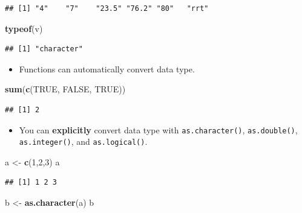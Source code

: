 \documentclass[]{book}
\newenvironment{Shaded}{\begin{snugshade}}{\end{snugshade}}
\newcommand{\KeywordTok}[1]{\textcolor[rgb]{0.13,0.29,0.53}{\textbf{{#1}}}}
\newcommand{\DecValTok}[1]{\textcolor[rgb]{0.00,0.00,0.81}{{#1}}}
\newcommand{\StringTok}[1]{\textcolor[rgb]{0.31,0.60,0.02}{{#1}}}
\newcommand{\OtherTok}[1]{\textcolor[rgb]{0.56,0.35,0.01}{{#1}}}
\newcommand{\NormalTok}[1]{{#1}}
\providecommand{\tightlist}{%
  \setlength{\itemsep}{0pt}\setlength{\parskip}{0pt}}
\begin{document}
\begin{verbatim}
## [1] "4"    "7"    "23.5" "76.2" "80"   "rrt"
\end{verbatim}

\begin{Shaded}
\begin{Highlighting}[]
\KeywordTok{typeof}\NormalTok{(v)}
\end{Highlighting}
\end{Shaded}

\begin{verbatim}
## [1] "character"
\end{verbatim}

\begin{itemize}
\tightlist
\item
  Functions can automatically convert data type.
\end{itemize}

\begin{Shaded}
\begin{Highlighting}[]
\KeywordTok{sum}\NormalTok{(}\KeywordTok{c}\NormalTok{(}\OtherTok{TRUE}\NormalTok{, }\OtherTok{FALSE}\NormalTok{, }\OtherTok{TRUE}\NormalTok{))}
\end{Highlighting}
\end{Shaded}

\begin{verbatim}
## [1] 2
\end{verbatim}

\begin{itemize}
\tightlist
\item
  You can \textbf{explicitly} convert data type with
  \texttt{as.character()}, \texttt{as.double()}, \texttt{as.integer()},
  and \texttt{as.logical()}.
\end{itemize}

\begin{Shaded}
\begin{Highlighting}[]
\NormalTok{a <-}\StringTok{ }\KeywordTok{c}\NormalTok{(}\DecValTok{1}\NormalTok{,}\DecValTok{2}\NormalTok{,}\DecValTok{3}\NormalTok{)}
\NormalTok{a}
\end{Highlighting}
\end{Shaded}

\begin{verbatim}
## [1] 1 2 3
\end{verbatim}

\begin{Shaded}
\begin{Highlighting}[]
\NormalTok{b <-}\StringTok{ }\KeywordTok{as.character}\NormalTok{(a)}
\NormalTok{b}
\end{Highlighting}
\end{Shaded}
\end{document}
